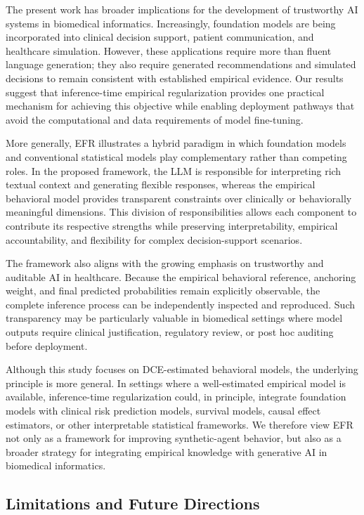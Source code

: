 \documentclass[11pt]{article}
\begin{document}
The present work has broader implications for the development of trustworthy AI systems in biomedical informatics. Increasingly, foundation models are being incorporated into clinical decision support, patient communication, and healthcare simulation. However, these applications require more than fluent language generation; they also require generated recommendations and simulated decisions to remain consistent with established empirical evidence. Our results suggest that inference-time empirical regularization provides one practical mechanism for achieving this objective while enabling deployment pathways that avoid the computational and data requirements of model fine-tuning.

More generally, EFR illustrates a hybrid paradigm in which foundation models and conventional statistical models play complementary rather than competing roles. In the proposed framework, the LLM is responsible for interpreting rich textual context and generating flexible responses, whereas the empirical behavioral model provides transparent constraints over clinically or behaviorally meaningful dimensions. This division of responsibilities allows each component to contribute its respective strengths while preserving interpretability, empirical accountability, and flexibility for complex decision-support scenarios.

The framework also aligns with the growing emphasis on trustworthy and auditable AI in healthcare. Because the empirical behavioral reference, anchoring weight, and final predicted probabilities remain explicitly observable, the complete inference process can be independently inspected and reproduced. Such transparency may be particularly valuable in biomedical settings where model outputs require clinical justification, regulatory review, or post hoc auditing before deployment.

Although this study focuses on DCE-estimated behavioral models, the underlying principle is more general. In settings where a well-estimated empirical model is available, inference-time regularization could, in principle, integrate foundation models with clinical risk prediction models, survival models, causal effect estimators, or other interpretable statistical frameworks. We therefore view EFR not only as a framework for improving synthetic-agent behavior, but also as a broader strategy for integrating empirical knowledge with generative AI in biomedical informatics.

\subsection{Limitations and Future Directions}
\end{document}
